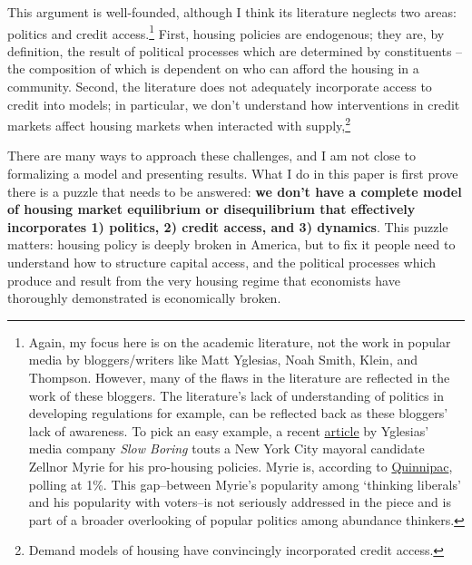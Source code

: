 \documentclass{article}[11pt]
\begin{document}
This argument is well-founded, although I think its literature neglects two areas: politics and credit access.\footnote{Again, my focus here is on the academic literature, not the work in popular media by bloggers/writers like Matt Yglesias, Noah Smith, Klein, and Thompson. However, many of the flaws in the literature are reflected in the work of these bloggers. The literature's lack of understanding of politics in developing regulations for example, can be reflected back as these bloggers' lack of awareness. To pick an easy example, a recent \href{https://www.slowboring.com/p/new-york-city-can-do-better-than}{article} by Yglesias' media company \textit{Slow Boring} touts a New York City mayoral candidate Zellnor Myrie for his pro-housing policies. \citep{zellnor} Myrie is, according to \href{https://poll.qu.edu/images/polling/nyc/nyc03052025_nytv24.pdf}{Quinnipac}, polling at 1\%. This gap--between Myrie's popularity among `thinking liberals' and his popularity with voters--is not seriously addressed in the piece and is part of a broader overlooking of popular politics among abundance thinkers.} First, housing policies are endogenous; they are, by definition, the result of political processes which are determined by constituents -- the composition of which is dependent on who can afford the housing in a community. Second, the literature does not adequately incorporate access to credit into models; in particular, we don't understand how interventions in credit markets affect housing markets when interacted with supply,\footnote{Demand models of housing have convincingly incorporated credit access.}

There are many ways to approach these challenges, and I am not close to formalizing a model and presenting results. What I do in this paper is first prove there is a puzzle that needs to be answered: \textbf{we don't have a complete model of housing market equilibrium or disequilibrium that effectively incorporates 1) politics, 2) credit access, and 3) dynamics}. This puzzle matters: housing policy is deeply broken in America, but to fix it people need to understand how to structure capital access, and the political processes which produce and result from the very housing regime that economists have thoroughly demonstrated is economically broken. 
\end{document}
